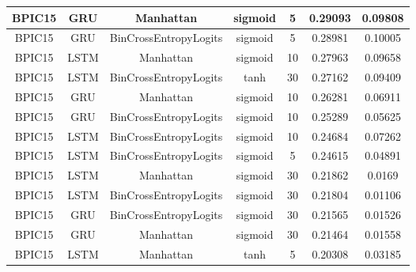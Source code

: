 \documentclass{article}%
\begin{document}
\begin{longtable}{|c|c|c|c|c|c|c|}
\hline%
BPIC15&GRU&Manhattan&sigmoid&5&0.29093&0.09808\\%
\hline%
BPIC15&GRU&BinCrossEntropyLogits&sigmoid&5&0.28981&0.10005\\%
\hline%
BPIC15&LSTM&Manhattan&sigmoid&10&0.27963&0.09658\\%
\hline%
BPIC15&LSTM&BinCrossEntropyLogits&tanh&30&0.27162&0.09409\\%
\hline%
BPIC15&GRU&Manhattan&sigmoid&10&0.26281&0.06911\\%
\hline%
BPIC15&GRU&BinCrossEntropyLogits&sigmoid&10&0.25289&0.05625\\%
\hline%
BPIC15&LSTM&BinCrossEntropyLogits&sigmoid&10&0.24684&0.07262\\%
\hline%
BPIC15&LSTM&BinCrossEntropyLogits&sigmoid&5&0.24615&0.04891\\%
\hline%
BPIC15&LSTM&Manhattan&sigmoid&30&0.21862&0.0169\\%
\hline%
BPIC15&LSTM&BinCrossEntropyLogits&sigmoid&30&0.21804&0.01106\\%
\hline%
BPIC15&GRU&BinCrossEntropyLogits&sigmoid&30&0.21565&0.01526\\%
\hline%
BPIC15&GRU&Manhattan&sigmoid&30&0.21464&0.01558\\%
\hline%
BPIC15&LSTM&Manhattan&tanh&5&0.20308&0.03185\\%
\hline%
\end{longtable}

%
\newpage%
\end{document}
